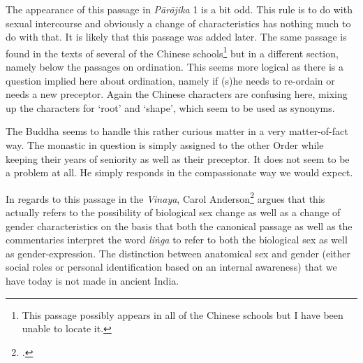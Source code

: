 The appearance of this passage in \textit{Pārājika} 1 is a bit odd. This rule is to do with sexual intercourse and obviously a change of characteristics has nothing much to do with that. It is likely that this passage was added later. The same passage is found in the texts of several of the Chinese schools\footnote{This passage possibly appears in all of the Chinese schools but I have been unable to locate it.} but in a different section, namely below the passages on ordination. This seems more logical as there is a question implied here about ordination, namely if (s)he needs to re-ordain or needs a new preceptor. Again the Chinese characters are confusing here, mixing up the characters for `root' and `shape', which seem to be used as synonyms.

The Buddha seems to handle this rather curious matter in a very matter-of-fact way. The monastic in question is simply assigned to the other Order while keeping their years of seniority as well as their preceptor. It does not seem to be a problem at all. He simply responds in the compassionate way we would expect.

In regards to this passage in the \textit{Vinaya}, Carol Anderson\footnote{\cite{anderson2016a}.} argues that this actually refers to the possibility of biological sex change as well as a change of gender characteristics on the basis that both the canonical passage as well as the commentaries interpret the word \textit{liṅga} to refer to both the biological sex as well as gender-expression. The distinction between anatomical sex and gender (either social roles or personal identification based on an internal awareness) that we have today is not made in ancient India.

